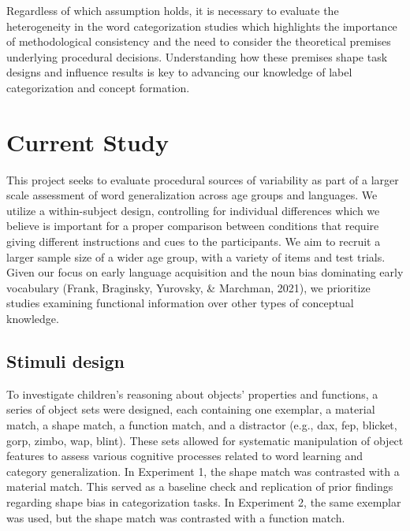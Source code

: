 \documentclass[10pt, letterpaper]{article}
\begin{document}
Regardless of which assumption holds, it is necessary to evaluate the
heterogeneity in the word categorization studies which highlights the
importance of methodological consistency and the need to consider the
theoretical premises underlying procedural decisions. Understanding how
these premises shape task designs and influence results is key to
advancing our knowledge of label categorization and concept formation.

\hypertarget{current-study}{%
\section{Current Study}\label{current-study}}

This project seeks to evaluate procedural sources of variability as part
of a larger scale assessment of word generalization across age groups
and languages. We utilize a within-subject design, controlling for
individual differences which we believe is important for a proper
comparison between conditions that require giving different instructions
and cues to the participants. We aim to recruit a larger sample size of
a wider age group, with a variety of items and test trials. Given our
focus on early language acquisition and the noun bias dominating early
vocabulary (Frank, Braginsky, Yurovsky, \& Marchman, 2021), we
prioritize studies examining functional information over other types of
conceptual knowledge.

\hypertarget{stimuli-design}{%
\subsection{Stimuli design}\label{stimuli-design}}

To investigate children's reasoning about objects' properties and
functions, a series of object sets were designed, each containing one
exemplar, a material match, a shape match, a function match, and a
distractor (e.g., dax, fep, blicket, gorp, zimbo, wap, blint). These
sets allowed for systematic manipulation of object features to assess
various cognitive processes related to word learning and category
generalization. In Experiment 1, the shape match was contrasted with a
material match. This served as a baseline check and replication of prior
findings regarding shape bias in categorization tasks. In Experiment 2,
the same exemplar was used, but the shape match was contrasted with a
function match.
\end{document}
